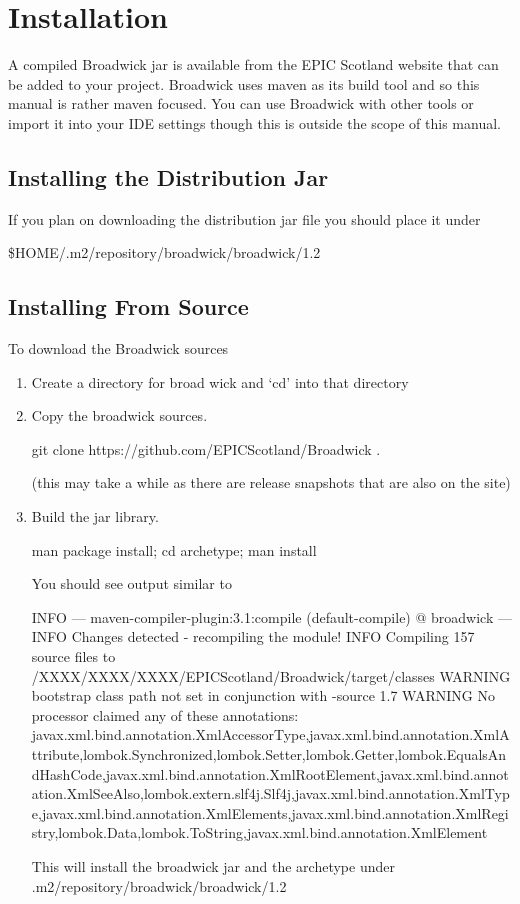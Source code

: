 \chapter{Installation}

A compiled Broadwick jar is available from the EPIC Scotland website that can be added to your project. Broadwick uses maven as its build tool and so this manual is rather maven focused. You can use Broadwick with other tools or import it into your IDE settings though this is outside the scope of this manual.

\section{Installing the Distribution Jar}
If you plan on downloading the distribution jar file you should place it under 
\begin{sourcecode}
\${HOME}/.m2/repository/broadwick/broadwick/1.2
\end{sourcecode}

\section{Installing From Source}
To download the Broadwick sources
\begin{enumerate}
\item Create a directory for broad wick and ‘cd’ into that directory
\item Copy the broadwick sources.
      \begin{sourcecode}
      git clone https://github.com/EPICScotland/Broadwick .
      \end{sourcecode}
      (this may take a while as there are release snapshots that are also on the site)
\item Build the jar library.
\begin{sourcecode}
man package install; cd archetype; man install
\end{sourcecode}

You should see output similar to
\begin{sourcecode}
INFO --- maven-compiler-plugin:3.1:compile (default-compile) @ broadwick ---
INFO Changes detected - recompiling the module!
INFO Compiling 157 source files to /XXXX/XXXX/XXXX/EPICScotland/Broadwick/target/classes
WARNING bootstrap class path not set in conjunction with -source 1.7
WARNING No processor claimed any of these annotations: javax.xml.bind.annotation.XmlAccessorType,javax.xml.bind.annotation.XmlAttribute,lombok.Synchronized,lombok.Setter,lombok.Getter,lombok.EqualsAndHashCode,javax.xml.bind.annotation.XmlRootElement,javax.xml.bind.annotation.XmlSeeAlso,lombok.extern.slf4j.Slf4j,javax.xml.bind.annotation.XmlType,javax.xml.bind.annotation.XmlElements,javax.xml.bind.annotation.XmlRegistry,lombok.Data,lombok.ToString,javax.xml.bind.annotation.XmlElement
\end{sourcecode}

      This will install the broadwick jar and the archetype under .m2/repository/broadwick/broadwick/1.2

\end{enumerate}

